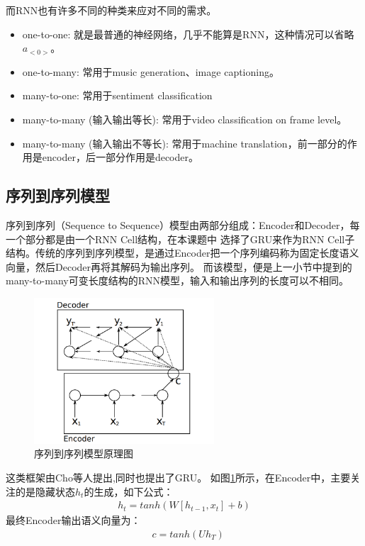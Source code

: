 \documentclass[supercite]{HustGraduPaper}
\theoremstyle{definition}
\begin{document}
而RNN也有许多不同的种类来应对不同的需求。
\begin{itemize}
  \item one-to-one: 就是最普通的神经网络，几乎不能算是RNN，这种情况可以省略$a_{<0>}$。
  \item one-to-many: 常用于music generation、image captioning。
  \item many-to-one: 常用于sentiment classification
  \item many-to-many (输入输出等长): 常用于video classification on frame level。
  \item many-to-many (输入输出不等长): 常用于machine translation，前一部分的作用是encoder，后一部分作用是decoder。
\end{itemize}

\subsection{序列到序列模型}
序列到序列（Sequence to Sequence）模型由两部分组成：Encoder和Decoder，每一个部分都是由一个RNN Cell结构，在本课题中
选择了GRU来作为RNN Cell子结构。传统的序列到序列模型，是通过Encoder把一个序列编码称为固定长度语义向量，然后Decoder再将其解码为输出序列。
而该模型，便是上一小节中提到的many-to-many可变长度结构的RNN模型，输入和输出序列的长度可以不相同。
\begin{figure}[htbp] %
  \centering %
  \includegraphics[width=0.6\textwidth]{images/seq2seq.png} %
  \caption{序列到序列模型原理图} %
  \label{Fig.seq2seq} %
\end{figure}
这类框架由Cho\cite{cho2014learning}等人提出,同时也提出了GRU。
如图\ref{Fig.seq2seq}所示，在Encoder中，主要关注的是隐藏状态$h_t$的生成，如下公式：
\begin{align}
  h_t = tanh(W[h_{t-1},x_t] + b) \label{1}
\end{align}
最终Encoder输出语义向量为：
\begin{align}
  &c = tanh(Uh_T) \label{2}
\end{align}
\end{document}
